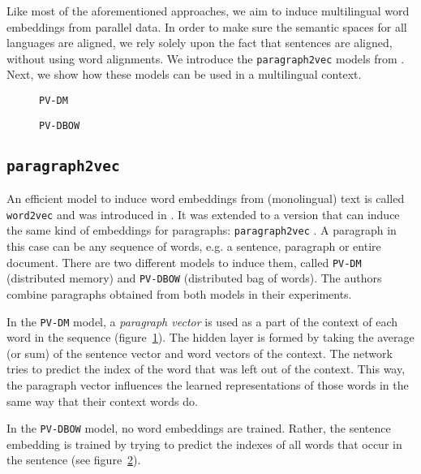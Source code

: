 Like most of the aforementioned approaches, we aim to induce multilingual word embeddings from parallel data. In order to make sure the semantic spaces for all languages are aligned, we rely solely upon the fact that sentences are aligned, without using word alignments.
We introduce the \texttt{paragraph2vec} models from \cite{Le2014}. Next, we show how these models can be used in a multilingual context.

\begin{figure*}\center
\begin{subfigure}{.45\textwidth}\center

\caption{{\tt PV-DM}}
\label{fig:p2v-DM}
\end{subfigure}
\begin{subfigure}{.45\textwidth}\center

\caption{{\tt PV-DBOW}}
\label{fig:p2v-DBOW}
\end{subfigure}
\caption{\texttt{paragraph2vec} models}
\end{figure*}

\subsection{\texttt{paragraph2vec}}
An efficient model to induce word embeddings from (monolingual) text is called \texttt{word2vec}  and was introduced in \cite{mikolov2013efficient}. It was extended to a version that can induce the same kind of embeddings for paragraphs: \texttt{paragraph2vec} \cite{Le2014}. A paragraph in this case can be any sequence of words, e.g. a sentence, paragraph or entire document. There are two different models to induce them, called {\tt PV-DM} (distributed memory) and {\tt PV-DBOW} (distributed bag of words). The authors combine paragraphs obtained from both models in their experiments.

In the {\tt PV-DM} model, a \emph{paragraph vector} is used as a part of the context of each word in the sequence (figure~\ref{fig:p2v-DM}).
The hidden layer is formed by taking the average (or sum) of the sentence vector and word vectors of the context. The network tries to predict the index of the word that was left out of the context.  
This way, the paragraph vector influences the learned representations of those words in the same way that their context words do.



In the {\tt PV-DBOW} model, no word embeddings are trained. Rather, the sentence embedding is trained by trying to predict the indexes of all words that occur in the sentence (see figure~\ref{fig:p2v-DBOW}).





